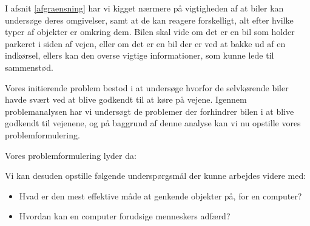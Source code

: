 I afsnit \ref{afgraensning} har vi kigget nærmere på vigtigheden af at biler kan undersøge deres omgivelser, samt at de kan reagere forskelligt, alt efter hvilke typer af objekter er omkring dem. Bilen skal vide om det er en bil som holder parkeret i siden af vejen, eller om det er en bil der er ved at bakke ud af en indkørsel, ellers kan den overse vigtige informationer, som kunne lede til sammenstød. 

Vores initierende problem bestod i at undersøge hvorfor de selvkørende biler havde svært ved at blive godkendt til at køre på vejene. Igennem problemanalysen har vi undersøgt de problemer der forhindrer bilen i at blive godkendt til vejenene, og på baggrund af denne analyse kan vi nu opstille vores problemformulering.

Vores problemformulering lyder da:

\vspace{10 mm}
\noindent{}

\vspace{10 mm}

Vi kan desuden opstille følgende underspørgsmål der kunne arbejdes videre med:
\begin{itemize}
	\item Hvad er den mest effektive måde at genkende objekter på, for en computer?
	\item Hvordan kan en computer forudsige menneskers adfærd?
\end{itemize}